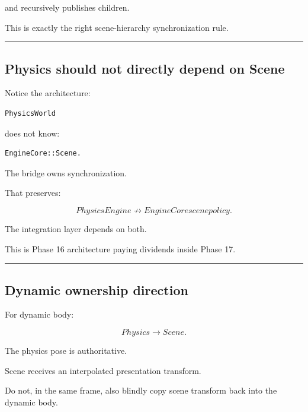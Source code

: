 and recursively publishes children.

This is exactly the right scene-hierarchy synchronization rule.

\begin{center}\rule{0.5\linewidth}{0.5pt}\end{center}

\subsection{Physics should not directly depend on Scene}\label{06-engine-ii-ch037-physics-should-not-directly-depend-on-scene}

\hypertarget{06-engine-ii-ch037-physics-should-not-directly-depend-on-scene}{}

Notice the architecture:

\begin{verbatim}
PhysicsWorld
\end{verbatim}

does not know:

\begin{verbatim}
EngineCore::Scene.
\end{verbatim}

The bridge owns synchronization.

That preserves:

\[
PhysicsEngine
\nrightarrow
EngineCore scene policy.
\]

The integration layer depends on both.

This is Phase 16 architecture paying dividends inside Phase 17.

\begin{center}\rule{0.5\linewidth}{0.5pt}\end{center}

\subsection{Dynamic ownership direction}\label{06-engine-ii-ch037-dynamic-ownership-direction}

\hypertarget{06-engine-ii-ch037-dynamic-ownership-direction}{}

For dynamic body:

\[
\boxed{
Physics\rightarrow Scene.
}
\]

The physics pose is authoritative.

Scene receives an interpolated presentation transform.

Do not, in the same frame, also blindly copy scene transform back into the dynamic body.

